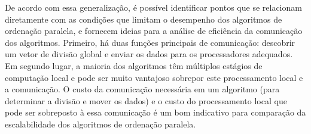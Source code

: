 De acordo com essa generalização, é possível identificar pontos que se relacionam diretamente com as condições que limitam o desempenho dos algoritmos de ordenação paralela, e fornecem ideias para a análise de eficiência da comunicação dos algoritmos. 
Primeiro, há duas funções principais de comunicação: descobrir um vetor de divisão global e enviar os dados para os processadores adequados. 
Em segundo lugar, a maioria dos algoritmos têm múltiplos estágios de computação local e pode ser muito vantajoso sobrepor este processamento local e a comunicação. 
O custo da comunicação necessária em um algoritmo (para determinar a divisão e mover os dados) e o custo do processamento local que pode ser sobreposto à essa comunicação é um bom indicativo para comparação da escalabilidade dos algoritmos de ordenação paralela.


